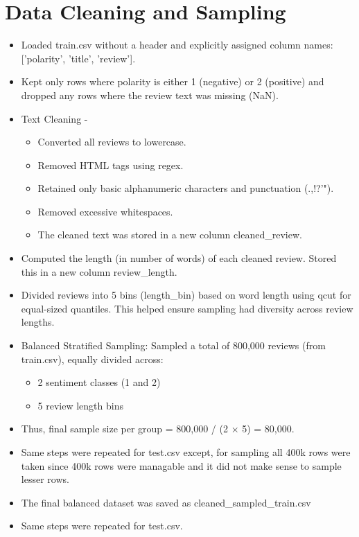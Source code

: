 \documentclass[12pt]{article}
\begin{document}
\section{Data Cleaning and Sampling}
\begin{itemize}
    \item Loaded train.csv without a header and explicitly assigned column names: ['polarity', 'title', 'review'].
    \item Kept only rows where polarity is either 1 (negative) or 2 (positive) and dropped any rows where the review text was missing (NaN).
    \item Text Cleaning -
    \begin{itemize}
        \item Converted all reviews to lowercase.
    \item Removed HTML tags using regex.
    \item Retained only basic alphanumeric characters and punctuation (.,!?'").
    \item Removed excessive whitespaces.
    \item The cleaned text was stored in a new column cleaned\_review.
    \end{itemize}
    \item Computed the length (in number of words) of each cleaned review. Stored this in a new column review\_length.
    \item Divided reviews into 5 bins (length\_bin) based on word length using qcut for equal-sized quantiles. This helped ensure sampling had diversity across review lengths.
    \item Balanced Stratified Sampling: Sampled a total of 800,000 reviews (from train.csv), equally divided across:
    \begin{itemize}
        \item 2 sentiment classes (1 and 2)
        \item 5 review length bins
        
    \end{itemize}
    \item Thus, final sample size per group = 800,000 / (2 × 5) = 80,000.
    \item Same steps were repeated for test.csv except, for sampling all 400k rows were taken since 400k rows were managable and it did not make sense to sample lesser rows.
    \item The final balanced dataset was saved as cleaned\_sampled\_train.csv
    \item Same steps were repeated for test.csv.

    
\end{itemize}
\end{document}
